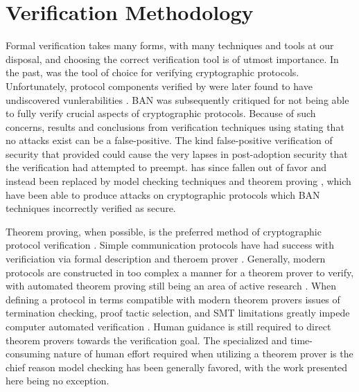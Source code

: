 \hypertarget{sec:methodology}{%
\chapter{Verification Methodology}\label{sec:methodology}}

Formal verification takes many forms, with many techniques and tools at our disposal, and choosing the correct verification tool is of utmost importance.
In the past,  \autocite{burrows1989logic} was the tool of choice for verifying cryptographic protocols.
Unfortunately, protocol components verified by  were later found to have undiscovered vunlerabilities \autocite{snekkenes1991exploring}.
BAN was subsequently critiqued \autocite{boyd1993limitation} for not being able to fully verify crucial aspects of cryptographic protocols.
Because of such concerns, results and conclusions from verification techniques using  stating that no attacks exist can be a false-positive.
The kind false-positive verification of security that  provided could cause the very lapses in post-adoption security that the verification had attempted to preempt.
 has since fallen out of favor and instead been replaced by model checking techniques \autocite{holzmann1991design} and theorem proving \autocite{andrews1980axiomatic}, which have been able to produce attacks on cryptographic protocols which BAN techniques incorrectly verified as secure.

Theorem proving, when possible, is the preferred method of cryptographic protocol verification \autocite{kobeissi2020verifpal}.
Simple communication protocols have had success with verificiation via formal description and theroem prover \autocite{berry1987towards, cheng1990formal}.
Generally, modern protocols are constructed in too complex a manner for a theorem prover to verify, with automated theorem proving still being an area of active research \autocite{xiong2020smartverif, bhargavan2021text}.
When defining a protocol in terms compatible with modern theorem provers issues of termination checking, proof tactic selection, and SMT limitations greatly impede computer automated verification \autocite{hassan2021automated}.
Human guidance is still required to direct theorem provers towards the verification goal.
The specialized and time-consuming nature of human effort required when utilizing a theorem prover is the chief reason model checking has been generally favored, with the work presented here being no exception.


